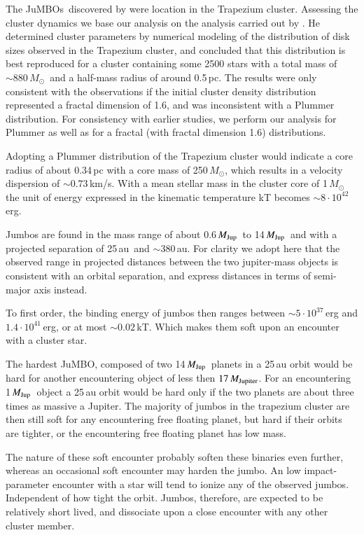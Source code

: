 \documentclass[aa]{aa}
\newcommand{\MSun}{\mbox{${M}_\odot$}}
\newcommand{\MJup}{\mbox{${M}_{\rm Jup}$}}
\newcommand{\jumbo}{\mbox{JuMBO}}
\newcommand{\jumbos}{\mbox{JuMBOs}}
\begin{document}
The \jumbos\, discovered by \cite{2023arXiv231001231P} were location
in the Trapezium cluster. Assessing the cluster dynamics we base our
analysis on the analysis carried out by \cite{2016MNRAS.457..313P}.
He determined cluster parameters by numerical modeling of the
distribution of disk sizes observed in the Trapezium cluster, and
concluded that this distribution is best reproduced for a cluster
containing some 2500 stars with a total mass of $\sim 880$\,\MSun\,
and a half-mass radius of around 0.5\,pc. The results were only
consistent with the observations if the initial cluster density
distribution represented a fractal dimension of 1.6, and was
inconsistent with a Plummer \cite{1911MNRAS..71..460P} distribution.
For consistency with earlier studies, we perform our analysis for
Plummer as well as for a fractal (with fractal dimension 1.6)
distributions.

Adopting a Plummer distribution of the Trapezium cluster would
indicate a core radius of about 0.34\,pc with a core mass of
250\,\MSun, which results in a velocity dispersion of $\sim
0.73$\,km/s. With a mean stellar mass in the cluster core of
1\,\MSun\, the unit of energy expressed in the kinematic temperature
kT becomes $\sim 8 \cdot 10^{42}$\,erg.

Jumbos are found in the mass range of about 0.6\,\MJup\, to
14\,\MJup\, and with a projected separation of 25\,au\, and $\sim
380$\,au. For clarity we adopt here that the observed range in
projected distances between the two jupiter-mass objects is consistent
with an orbital separation, and express distances in terms of
semi-major axis instead.

To first order, the binding energy of jumbos then ranges between $\sim
5\cdot 10^{37}$\,erg and $1.4\cdot 10^{41}$\,erg, or at most $\sim
0.02$\,kT. Which makes them soft upon an encounter with a cluster
star.

The hardest \jumbo, composed of two 14\,\MJup\, planets in a 25\,au
orbit would be hard for another encountering object of less then
$17\,M_{\rm Jupiter}$.  For an encountering 1\,\MJup\, object a 25\,au
orbit would be hard only if the two planets are about three times as
massive a Jupiter.  The majority of jumbos in the trapezium cluster
are then still soft for any encountering free floating planet, but
hard if their orbits are tighter, or the encountering free floating
planet has low mass.

The nature of these soft encounter probably soften these binaries even
further, whereas an occasional soft encounter may harden the jumbo.
An low impact-parameter encounter with a star will tend to ionize any
of the observed jumbos.  Independent of how tight the orbit.  Jumbos,
therefore, are expected to be relatively short lived, and dissociate
upon a close encounter with any other cluster member.
\end{document}
